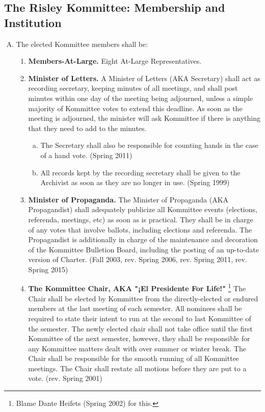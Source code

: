 \documentclass[12pt]{article}
\begin{document}
\begin{enumerate}[A.]
\section{The Risley Kommittee: Membership and Institution}
\begin{enumerate}[A.] 
\item The elected Kommittee members shall be:
\begin{enumerate}[1.]
\item \textbf{Members-At-Large.} Eight At-Large Representatives.
\item \textbf{Minister of Letters.} A Minister of Letters (AKA Secretary) shall act as recording secretary, keeping minutes of all meetings, and shall post minutes within one day of the meeting being adjourned, unless a simple majority of Kommittee votes to extend this deadline. As soon as the meeting is adjourned, the minister will ask Kommittee if there is anything that they need to add to the minutes.
\begin{enumerate}[a.]
\item The Secretary shall also be responsible for counting hands in the case of a hand vote. (Spring 2011)
\item All records kept by the recording secretary shall be given to the Archivist as soon as they are no longer in use. (Spring 1999)
\end{enumerate}
\item \textbf{Minister of Propaganda.} The Minister of Propaganda (AKA Propagandist) shall adequately publicize all Kommittee events (elections, referenda, meetings, etc) as soon as is practical. They shall be in charge of any votes that involve ballots, including elections and referenda. The Propagandist is additionally in charge of the maintenance and decoration of the Kommittee Bulletion Board, including the posting of an up-to-date version of Charter. (Fall 2003, rev. Spring 2006, rev. Spring 2011, rev. Spring 2015)
\item \textbf{The Kommittee Chair, AKA "¡El Presidente For Life!"} \footnote{Blame Dante Heifets (Spring 2002) for this.} The Chair shall be elected by Kommittee from the directly-elected or endured members at the last meeting of each semester. All nominees shall be required to state their intent to run at the second to last Kommittee of the semester. The newly elected chair shall not take office until the first Kommittee of the next semester, however, they shall be responsible for any Kommittee matters dealt with over summer or winter break. The Chair shall be responsible for the smooth running of all Kommittee meetings. The Chair shall restate all motions before they are put to a vote. (rev. Spring 2001)

\end{enumerate}
\end{enumerate}
\end{enumerate}
\end{document}
